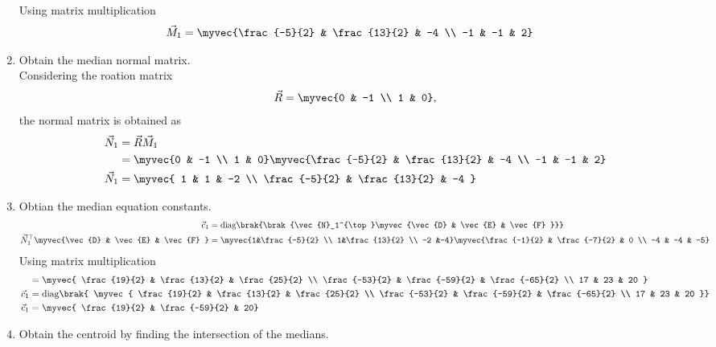 \documentclass[11pt]{book}
\begin{document}
\begin{enumerate}[label=\thesubsection.\arabic*.,ref=\thesubsection.\theenumi]
  Using matrix multiplication 
  \begin{align}
   \vec{M}_1 &=   \myvec{\frac{-5}{2} & \frac{13}{2} & -4 \\ -1 & -1 & 2}
  \end{align}
\item Obtain the median normal matrix. \\
\solution Considering the roation matrix
\begin{align}
\vec{R}  = \myvec{0 & -1 \\ 1 & 0},
\end{align}
the normal matrix is obtained as
\begin{align}
\vec{N}_1 &= \vec{R}\vec{M}_1  \\
&=\myvec{0 & -1 \\ 1 & 0} \myvec{\frac{-5}{2} & \frac{13}{2} & -4 \\ -1 & -1 & 2} \\
\vec{N}_1 &=  \myvec{ 1 & 1 & -2 \\ \frac{-5}{2} & \frac{13}{2} & -4 }
\end{align}
\item Obtian the median equation constants. \\
\begin{align}
\vec{c}_1 &= \text{diag}\brak{\brak{\vec{N}_1^{\top}\myvec{\vec{D} & \vec{E} & \vec{F} }}}  \\
\vec{N}_1^{\top}\myvec{\vec{D} & \vec{E} & \vec{F} } &= \myvec{1&\frac{-5}{2} \\ 1&\frac{13}{2} \\ -2 &-4}\myvec{\frac{-1}{2} & \frac{-7}{2} & 0 \\ -4 & -4 & -5} \\
\end{align}
Using matrix multiplication
\begin{align}
    &=\myvec{ \frac{19}{2} & \frac{13}{2} & \frac{25}{2} \\ \frac{-53}{2} & \frac{-59}{2} & \frac{-65}{2} \\ 17 & 23 & 20 } \\
    \vec{c}_1 &= \text{diag}\brak{ \myvec{ \frac{19}{2} & \frac{13}{2} & \frac{25}{2} \\ \frac{-53}{2} & \frac{-59}{2} & \frac{-65}{2} \\ 17 & 23 & 20 }} \\
    \vec{c}_1 &= \myvec{ \frac{19}{2} & \frac{-59}{2} & 20}
\end{align}
\item Obtain the centroid by finding the intersection of the medians.\\

\end{enumerate}
\end{document}

